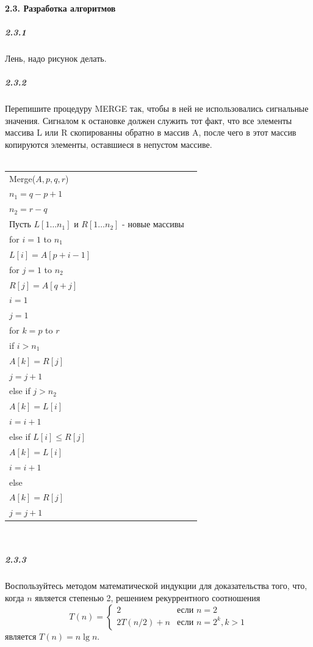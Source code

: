 \paragraph{2.3. Разработка алгоритмов}
\subparagraph{2.3.1}
Лень, надо рисунок делать.

\subparagraph{2.3.2}
Перепишите процедуру MERGE так, чтобы в ней не использовались сигнальные значения.
Сигналом к остановке должен служить тот факт, что все элементы массива L или R скопированны обратно в массив A,
после чего в этот массив копируются элементы, оставшиеся в непустом массиве.\\
\\
\begin{tabular}{ll}
Merge($A, p, q, r$) & \\
\quad $n_1 = q - p + 1$ & \\
\quad $n_2 = r - q$ & \\ 
\quad Пусть $L[1 \ldots n_1]$ и $R[1 \ldots n_2]$ - новые массивы & \\
\quad for $i = 1$ to $n_1$ & \\
\quad \quad $L[i] = A[p + i - 1]$ & \\
\quad for $j = 1$ to $n_2$ & \\
\quad \quad $R[j] = A[q + j]$ & \\
\quad $i = 1$ & \\
\quad $j = 1$ & \\
\quad for $k = p$ to $r$ & \\
\quad \quad if $i > n_1$ & \\
\quad \quad \quad $A[k] = R[j]$ & \\
\quad \quad \quad $j = j + 1$ & \\
\quad \quad else if $j > n_2$ & \\
\quad \quad \quad $A[k] = L[i]$ & \\
\quad \quad \quad $i = i + 1$ & \\
\quad \quad else if $L[i] \leq R[j]$ & \\
\quad \quad \quad $A[k] = L[i]$ & \\
\quad \quad \quad $i = i + 1$ & \\
\quad \quad else & \\
\quad \quad \quad $A[k] = R[j]$ & \\
\quad \quad \quad $j = j + 1$ & \\
\end{tabular} \\

\subparagraph{2.3.3}
Воспользуйтесь методом математической индукции для доказательства того, что, когда $n$ является степенью 2, решением рекуррентного соотношения 
\[
T(n) = \begin{cases}
2 & \text{если } n = 2 \\
2T(n/2) + n & \text{если } n = 2^k, k > 1
\end{cases}
\] 
является $T(n) = n \lg n$.

